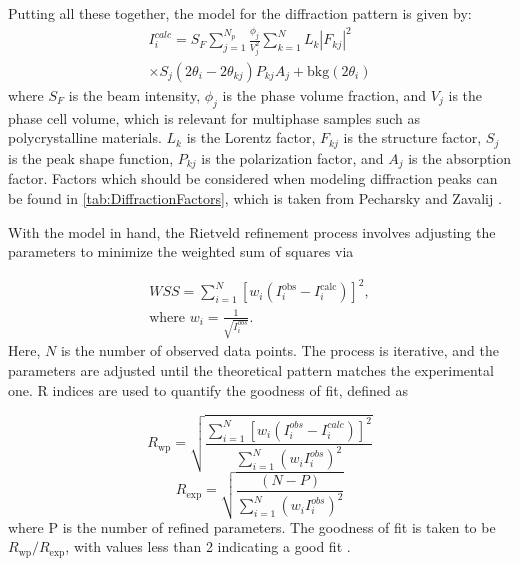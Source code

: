\documentclass[aps,prb,twocolumn,superscriptaddress]{revtex4-2}
\begin{document}
Putting all these together, the model for the diffraction pattern is given by:
\begin{equation}
    \begin{split}
        I_i^{calc} = S_F \sum_{j=1}^{N_p} \frac{\phi_j}{V_j^2} \sum_{k=1}^N L_k |F_{kj}|^2 \\
        \times S_j(2\theta_i - 2\theta_{kj}) P_{kj} A_j + \text{bkg}(2\theta_i)
    \end{split}
\end{equation}
where $S_F$ is the beam intensity, $\phi_j$ is the phase volume fraction, and
$V_j$ is the phase cell volume, which is relevant for multiphase samples such as
polycrystalline materials. $L_k$ is the Lorentz factor, $F_{kj}$ is the structure
factor, $S_j$ is the peak shape function, $P_{kj}$ is the polarization factor,
and $A_j$ is the absorption factor. Factors which should be considered when 
modeling diffraction peaks can be found in \ref{tab:DiffractionFactors}, which
is taken from Pecharsky and Zavalij \cite{pecharsky2005fundamentals}.

With the model in hand, the Rietveld refinement process involves adjusting the
parameters to minimize the weighted sum of squares via 

\begin{equation}
    \begin{split}
    WSS = \sum_{i=1}^N \left[ w_i(I_i^{\text{obs}} - I_i^{\text{calc}})\right]^2, \\
    \text{where } w_i = \frac{1}{\sqrt{I_i^{obs}}}.
    \end{split}
\end{equation}
Here, $N$ is the number of observed data points. The process is
iterative, and the parameters are adjusted until the theoretical pattern matches
the experimental one. R indices are used to quantify the goodness of fit, defined
as 

\begin{equation}
    R_{\text{wp}} = \sqrt{\frac{\sum_{i = 1}^N[w_i(I_i^{obs} - I_i^{calc})]^2}
            {\sum_{i=1}^N (w_iI_i^{obs})^2}}
\end{equation}
\begin{equation}
    R_{\text{exp}} = \sqrt{\frac{(N - P)}{\sum_{i=1}^N (w_iI_i^{obs})^2}}
\end{equation}  
where P is the number of refined parameters. The goodness of fit is taken to be 
$R_{\text{wp}}/R_{\text{exp}}$, with values less than 2 indicating a good fit 
\cite{Lutterotti_Rietveld}. 
\end{document}
